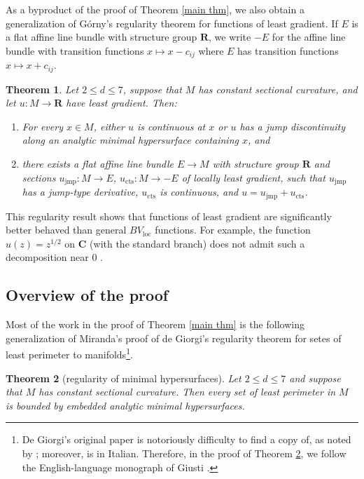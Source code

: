 \documentclass[reqno,10pt]{amsart}
\newcommand{\RR}{\mathbf{R}}
\newcommand{\CC}{\mathbf{C}}
\newcommand{\loc}{\mathrm{loc}}
\newtheorem{mainthm}{Theorem}
\theoremstyle{definition}
\numberwithin{equation}{section}
\begin{document}
As a byproduct of the proof of Theorem \ref{main thm}, we also obtain a generalization of G\'orny's regularity theorem \cite[Theorem 1.2]{górny2017planar} for functions of least gradient.
If $E$ is a flat affine line bundle with structure group $\RR$, we write $-E$ for the affine line bundle with transition functions $x \mapsto x - c_{ij}$ where $E$ has transition functions $x \mapsto x + c_{ij}$.

\begin{mainthm}\label{Gorny regularity}
Let $2 \leq d \leq 7$, suppose that $M$ has constant sectional curvature, and let $u: M \to \RR$ have least gradient.
Then:
\begin{enumerate}
\item For every $x \in M$, either $u$ is continuous at $x$ or $u$ has a jump discontinuity along an analytic minimal hypersurface containing $x$, and
\item there exists a flat affine line bundle $E \to M$ with structure group $\RR$ and sections $u_{\text{jmp}}: M \to E$, $u_{\text{cts}}: M \to -E$ of locally least gradient, such that $u_{\text{jmp}}$ has a jump-type derivative, $u_{\text{cts}}$ is continuous, and $u = u_{\text{jmp}} + u_{\text{cts}}$.
\end{enumerate}
\end{mainthm}

This regularity result shows that functions of least gradient are significantly better behaved than general $BV_\loc$ functions.
For example, the function $u(z) = z^{1/2}$ on $\CC$ (with the standard branch) does not admit such a decomposition near $0$ \cite[Example 4.1]{Ambrosio2000FunctionsOB}.


\subsection{Overview of the proof}
Most of the work in the proof of Theorem \ref{main thm} is the following generalization of Miranda's proof \cite{Miranda66} of de Giorgi's regularity theorem \cite{deGiorgi61} for setes of least perimeter to manifolds\footnote{De Giorgi's original paper \cite{deGiorgi61} is notoriously difficulty to find a copy of, as noted by \cite{Miranda66, Giusti77}; moreover, \cite{Miranda66} is in Italian. Therefore, in the proof of Theorem \ref{main lma}, we follow the English-language monograph of Giusti \cite[Part 1]{Giusti77}.}.

\begin{mainthm}[regularity of minimal hypersurfaces]\label{main lma}
Let $2 \leq d \leq 7$ and suppose that $M$ has constant sectional curvature.
Then every set of least perimeter in $M$ is bounded by embedded analytic minimal hypersurfaces.
\end{mainthm}
\end{document}

